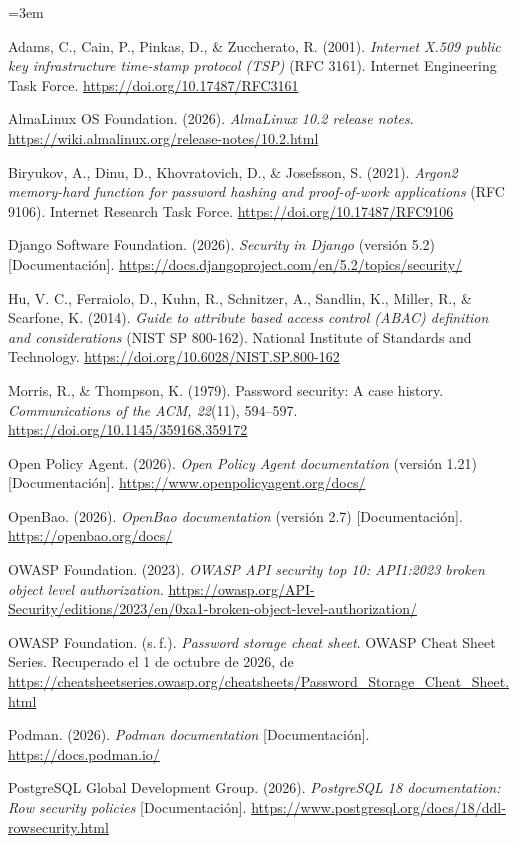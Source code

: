 \documentclass[11pt,letterpaper]{article}
\begin{document}
{\small
\setlength{\parskip}{0.45em}
\emergencystretch=3em

Adams, C., Cain, P., Pinkas, D., \& Zuccherato, R. (2001). \emph{Internet X.509 public key
infrastructure time-stamp protocol (TSP)} (RFC 3161). Internet Engineering Task Force.
\url{https://doi.org/10.17487/RFC3161}

AlmaLinux OS Foundation. (2026). \emph{AlmaLinux 10.2 release notes}.
\url{https://wiki.almalinux.org/release-notes/10.2.html}

Biryukov, A., Dinu, D., Khovratovich, D., \& Josefsson, S. (2021). \emph{Argon2 memory-hard function
for password hashing and proof-of-work applications} (RFC 9106). Internet Research Task Force.
\url{https://doi.org/10.17487/RFC9106}

Django Software Foundation. (2026). \emph{Security in Django} (versión 5.2) [Documentación].
\url{https://docs.djangoproject.com/en/5.2/topics/security/}

Hu, V. C., Ferraiolo, D., Kuhn, R., Schnitzer, A., Sandlin, K., Miller, R., \& Scarfone, K. (2014).
\emph{Guide to attribute based access control (ABAC) definition and considerations} (NIST SP 800-162).
National Institute of Standards and Technology. \url{https://doi.org/10.6028/NIST.SP.800-162}

Morris, R., \& Thompson, K. (1979). Password security: A case history. \emph{Communications of the ACM,
22}(11), 594--597. \url{https://doi.org/10.1145/359168.359172}

Open Policy Agent. (2026). \emph{Open Policy Agent documentation} (versión 1.21) [Documentación].
\url{https://www.openpolicyagent.org/docs/}

OpenBao. (2026). \emph{OpenBao documentation} (versión 2.7) [Documentación].
\url{https://openbao.org/docs/}

OWASP Foundation. (2023). \emph{OWASP API security top 10: API1:2023 broken object level
authorization}. \url{https://owasp.org/API-Security/editions/2023/en/0xa1-broken-object-level-authorization/}

OWASP Foundation. (s.\,f.). \emph{Password storage cheat sheet}. OWASP Cheat Sheet Series. Recuperado el
1 de octubre de 2026, de
\url{https://cheatsheetseries.owasp.org/cheatsheets/Password_Storage_Cheat_Sheet.html}

Podman. (2026). \emph{Podman documentation} [Documentación]. \url{https://docs.podman.io/}

PostgreSQL Global Development Group. (2026). \emph{PostgreSQL 18 documentation: Row security policies}
[Documentación]. \url{https://www.postgresql.org/docs/18/ddl-rowsecurity.html}

}
\end{document}

